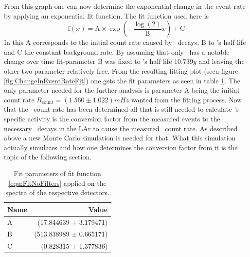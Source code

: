 \documentclass[encoding=utf8,british]{tumphthesis}
\begin{document}
From this graph one can now determine the exponential change in the event rate by applying an exponential fit function.
The fit function used here is
\begin{equation}
\mathrm{f}(x) = \mathrm{A}\times\exp\left(-\frac{\log(2)}{\mathrm{B}} x \right) + \mathrm{C}
\label{equ:FitFilters}
\end{equation}
In this A corresponds to the initial count rate caused by \Kr\ decays, B to \Kr's half life and C the constant background rate.
By assuming that only \Kr\ has a notable change over time fit-parameter B was fixed to \Kr's half life \(10.739\unit{y}\) and leaving the other two parameter relatively free.
From the resulting fitting plot (seen figure \ref{fig:ChangeInEventRateFit}) one gets the fit parameters as seen in table \ref{tab:FitParZeit}.
The only parameter needed for the further analysis is parameter \(\mathrm{A}\) being the initial count rate $R_{\mathrm{count}} = (1.560\pm1.022) \unit{mHz}$ wanted from the fitting process. 
Now that the \Kr\ count rate has been determined all that is still needed to calculate \Kr's specific activity is the conversion factor from the measured events to the necessary \Kr\ decays in the LAr to cause the measured \Kr\ count rate.
As described above a new Monte Carlo simulation is needed for that.
What this simulation actually simulates and how one determines the conversion factor from it is the topic of the following section.


\begin{table}[t!]
	\centering
	\begin{tabular}{|l|r|}
		\hline
		Name	& Value  \\ 
		\hline
		A  &	(17.844639 \(\pm\)	3.179471)\\	
		\hline
		B  &	(513.838989 \(\pm\)	0.665171)\\	
		\hline
		C  &	(0.828315 \(\pm\)	1.377836)\\
		\hline
	\end{tabular}
	\caption{Fit parameters of fit function \ref{equ:FitNoFilters} applied on the spectra of the respective detectors.}
    \label{tab:FitParZeit}
\end{table}
\end{document}

